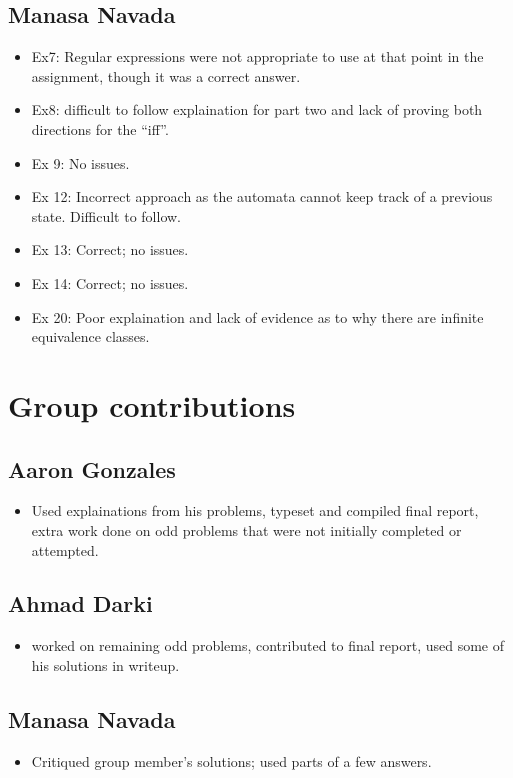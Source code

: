 \documentclass[titlepage]{article}\usepackage[]{graphicx}\usepackage[]{color}
\begin{document}
\subsection{Manasa Navada}
\begin{itemize}
	\item Ex7: Regular expressions were not appropriate to use at that
		point in the assignment, though it was a correct answer. 

	\item Ex8: difficult to follow explaination for part two and lack of
		proving both directions for the ``iff''. 

	\item Ex 9: No issues.

	\item Ex 12: Incorrect approach as the automata cannot keep track of a
		previous state. Difficult to follow.

	\item Ex 13: Correct; no issues.

	\item Ex 14: Correct; no issues.

	\item Ex 20: Poor explaination and lack of evidence as to why there are
		infinite equivalence classes.
\end{itemize}


\section*{Group contributions}
\subsection{Aaron Gonzales}
\begin{itemize}
	\item Used explainations from his problems, typeset and compiled final
		report, extra work done on odd problems that were not initially
		completed or attempted. 
\end{itemize}
\subsection{Ahmad Darki}
\begin{itemize}
	\item worked on remaining odd problems, contributed to final report, used
    some of his solutions in writeup.
\end{itemize}
\subsection{Manasa Navada}
\begin{itemize}
	\item Critiqued group member's solutions; used parts of a few answers.
\end{itemize}
\end{document}
